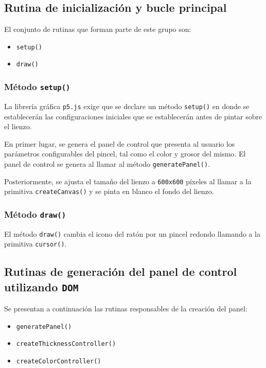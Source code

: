 \documentclass[10pt,a4paper]{report}
\begin{document}
	\subsection{Rutina de inicialización y bucle principal}\label{sub:main}
	El conjunto de rutinas que forman parte de este grupo son:
	\begin{itemize}
	 	\item \texttt{setup()}
	 	\item \texttt{draw()}
	 \end{itemize} 
	 
	 \subsubsection{Método \texttt{setup()}}
	 La librería gráfica \texttt{p5.js} exige que se declare un método \texttt{setup()} en donde se establecerán las configuraciones iniciales que se establecerán antes de pintar sobre el lienzo.
	 
	 En primer lugar, se genera el panel de control que presenta al usuario los parámetros configurables del pincel, tal como el color y grosor del mismo. El panel de control se genera al llamar al método \texttt{generatePanel()}.
	 
	 Posteriormente, se ajusta el tamaño del lienzo a  \texttt{600x600} píxeles al llamar a la primitiva \texttt{createCanvas()} y se pinta en blanco el fondo del lienzo.
	 
	
	
	\subsubsection{Método \texttt{draw()}}	
	El método \texttt{draw()} cambia el icono del ratón por un pincel redondo llamando a la primitiva \texttt{cursor()}.
	
	
	
	\subsection{Rutinas de generación del panel de control utilizando \texttt{DOM}}\label{sub:dom}
	Se presentan a continuación las rutinas responsables de la creación del panel:
	\begin{itemize}
	 	\item \texttt{generatePanel()}
	 	\item \texttt{createThicknessController()}
	 	\item \texttt{createColorController()}
	 \end{itemize}
	 
\end{document}
